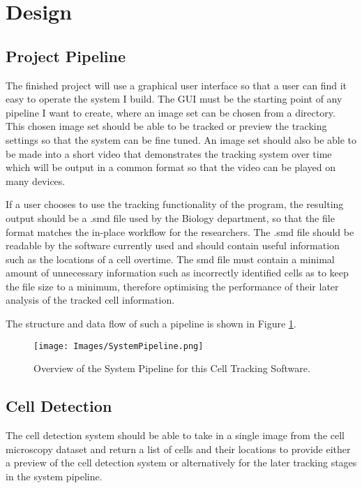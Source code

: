 \documentclass[12pt a4paper]{article}
\begin{document}
\section{Design}
\subsection{Project Pipeline}
The finished project will use a graphical user interface so that a user can find it easy to operate the system I build. The GUI must be the starting point of any pipeline I want to create, where an image set can be chosen from a directory. This chosen image set should be able to be tracked or preview the tracking settings so that the system can be fine tuned. An image set should also be able to be made into a short video that demonstrates the tracking system over time which will be output in a common format so that the video can be played on many devices. 

If a user chooses to use the tracking functionality of the program, the resulting output should be a .smd file used by the Biology department, so that the file format matches the in-place workflow for the researchers. The .smd file should be readable by the software currently used and should contain useful information such as the locations of a cell overtime. The smd file must contain a minimal amount of unnecessary information such as incorrectly identified cells as to keep the file size to a minimum, therefore optimising the performance of their later analysis of the tracked cell information.

The structure and data flow of such a pipeline is shown in Figure \ref{fig:sysPipe}.
    \begin{figure}
        \centering
        \texttt{[image: Images/SystemPipeline.png]}
        \caption{Overview of the System Pipeline for this Cell Tracking Software.}
        \label{fig:sysPipe}
    \end{figure}
\subsection{Cell Detection}
The cell detection system should be able to take in a single image from the cell microscopy dataset and return a list of cells and their locations to provide either a preview of the cell detection system or alternatively for the later tracking stages in the system pipeline.
\end{document}
